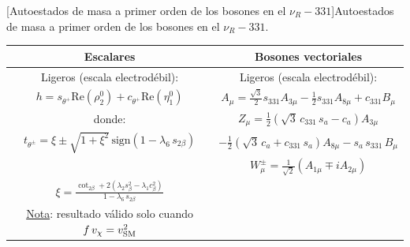 \newpage
\begin{center}
[\hspace{-0.125in}Autoestados de masa a primer orden de los bosones en el $\nu_R-331$]{Autoestados de masa a primer orden de los bosones en el $\nu_R-331$.} %

% 
\begin{small}
\begin{tabular}{|c | c|} 
 \hline
Escalares & Bosones vectoriales \\[1pt]
\hline
Ligeros (escala electrodébil): \hspace{\fill} &  Ligeros (escala electrodébil): \hspace{\fill} \\[5pt] 
 $h=  s_{\theta^+} \text{Re} (\rho_2^0)+ c_{\theta^+} \text{Re} (\eta_1^0) $ & \hspace{-0.in} $ A_\mu = \frac{\sqrt{3}}{2} s_{331} A_{3\mu}- \frac{1}{2} s_{331} A_{8\mu} + c_{331}  B_\mu $  \\[2pt] 
\hspace{-3.0in} donde:  &\hspace{-0.7in} $Z_\mu = \frac{1}{2} (\sqrt{3} \, c_{331}\, s_a-c_a ) A_{3\mu} $  \\[0pt]
$t_{\theta^{\pm}} = \xi \pm \sqrt{1+\xi^2} \, \text{sign}(1-\lambda_6 \, s_{2\beta}) $  & \hspace{0.5in}$-\frac{1}{2} (\sqrt{3} \,c_a + c_{331}\, s_a ) A_{8\mu} - s_a\, s_{331} \, B_\mu $ \hspace{0.015in}  \\[10pt] 
   & \hspace{-1.0in} $W^{\pm}_\mu = \frac{1}{\sqrt{2}} \left( A_{1\mu} \mp i A_{2\mu} \right)$  \\
$\xi = \frac{\cot_{2\beta} + 2(\lambda_2 s^2_\beta-\lambda_1 c^2_\beta)}{1-\lambda_6 \, s_{2\beta}}$ \hspace{0.6in} & \\[5pt]
\hspace{-0.1in}\underline{Nota}: resultado válido solo cuando $f\, v_\chi = v_{\rm SM}^2$ &\\[10pt] 

\end{tabular}
\end{small}
\end{center}
